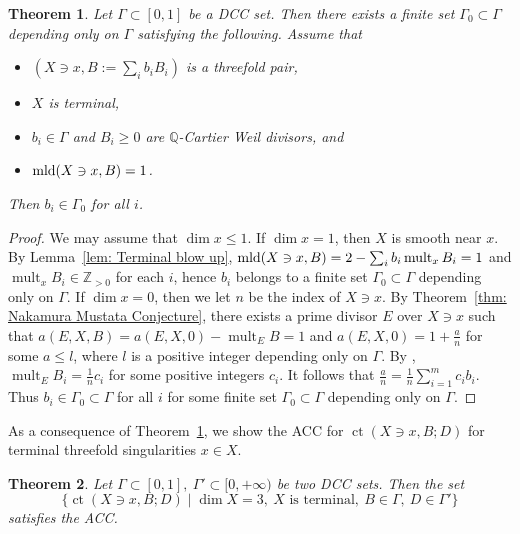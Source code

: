 \documentclass[11pt]{amsart}
\numberwithin{equation}{section}
\newcommand{\Qq}{\mathbb{Q}}
\newcommand{\mld}{{\rm{mld}}}
\newcommand{\ct}{\operatorname{ct}}
\newcommand{\mult}{\operatorname{mult}}
\newcommand{\Ii}{{\Gamma}}
\newtheorem{thm}{Theorem}[section]
\theoremstyle{definition}
\theoremstyle{definition}
\begin{document}
\begin{thm}\label{thm: 3fold acc ct general terminal germ case}
Let $\Ii\subset [0,1]$ be a DCC set. Then there exists a finite set $\Ii_0\subset\Ii$ depending only on $\Ii$ satisfying the following. Assume that
\begin{itemize}
    \item $(X\ni x,B:=\sum_ib_iB_i)$ is a threefold pair, 
    \item $X$ is terminal,
    \item  $b_i\in \Ii$ and $B_i\geq 0$ are $\Qq$-Cartier Weil divisors, and
    \item $\mld(X\ni x,B)=1$.
\end{itemize}
Then $b_i\in\Ii_0$ for all $i$.
\end{thm}



\begin{proof}
We may assume that $\dim x\leq 1$. If $\dim x=1$, then $X$ is smooth near $x$. By Lemma~\ref{lem: Terminal blow up}, $\mld(X\ni x, B)=2-\sum_i b_i\mult_x B_i=1$ and $\mult_xB_i\in\mathbb Z_{>0}$ for each $i$, hence $b_i$ belongs to a finite set $\Ii_0\subset \Ii$ depending only on $\Ii$. If $\dim x=0$, then we let $n$ be the index of $X\ni x$. By Theorem~\ref{thm: Nakamura Mustata Conjecture}, there exists a prime divisor $E$ over $X\ni x$ such that $a(E,X,B)=a(E,X,0)-\mult_E B=1$ and $a(E,X,0)=1+\frac{a}{n}$ for some $a\leq 
l$, where $l$ is a positive integer depending only on $\Ii$. By \cite[Lemma~5.1]{Kaw88}, $\mult_E B_i=\frac{1}{n}c_i$ for some positive integers $c_i$. It follows that $\frac{a}{n}=\frac{1}{n}\sum_{i=1}^m c_ib_i$. Thus $b_i\in\Ii_0\subset\Ii$ for all $i$ for some finite set $\Ii_0\subset \Ii$ depending only on $\Ii$.
\end{proof}

As a consequence of Theorem~\ref{thm: 3fold acc ct general terminal germ case}, we show the ACC for $\ct(X\ni x, B;D)$ for terminal threefold singularities $x\in X$. 

\begin{thm}\label{thm: ACC ct local with base terminal}
Let $\Ii\subset [0,1],~\Ii'\subset [0,+\infty)$ be two DCC sets. Then the set 
$$\{\ct(X\ni x, B;D)\mid \dim X=3,~X \text{ is terminal},~B\in \Ii,~D\in \Ii'\}$$
satisfies the ACC.
\end{thm}
\end{document}
